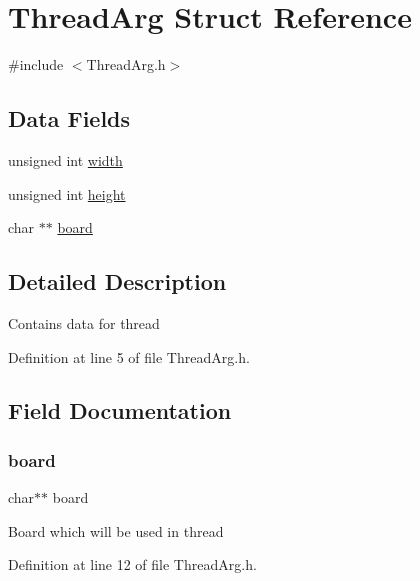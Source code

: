 \hypertarget{struct_thread_arg}{}\section{Thread\+Arg Struct Reference}
\label{struct_thread_arg}


{\ttfamily \#include $<$Thread\+Arg.\+h$>$}

\subsection*{Data Fields}
\begin{DoxyCompactItemize}
\item 
unsigned int \mbox{\hyperlink{struct_thread_arg_aca34d28e3d8bcbcadb8edb4e3af24f8c}{width}}
\item 
unsigned int \mbox{\hyperlink{struct_thread_arg_ab2e78c61905b4419fcc7b4cfc500fe85}{height}}
\item 
char $\ast$$\ast$ \mbox{\hyperlink{struct_thread_arg_a55cb9414a970dc2e3e8bb4a4d151b79f}{board}}
\end{DoxyCompactItemize}


\subsection{Detailed Description}
Contains data for thread 

Definition at line 5 of file Thread\+Arg.\+h.



\subsection{Field Documentation}
\mbox{\label{struct_thread_arg_a55cb9414a970dc2e3e8bb4a4d151b79f}} 
\subsubsection{\texorpdfstring{board}{board}}
{\footnotesize\ttfamily char$\ast$$\ast$ board}

Board which will be used in thread 

Definition at line 12 of file Thread\+Arg.\+h.

\mbox{\label{struct_thread_arg_ab2e78c61905b4419fcc7b4cfc500fe85}} 
